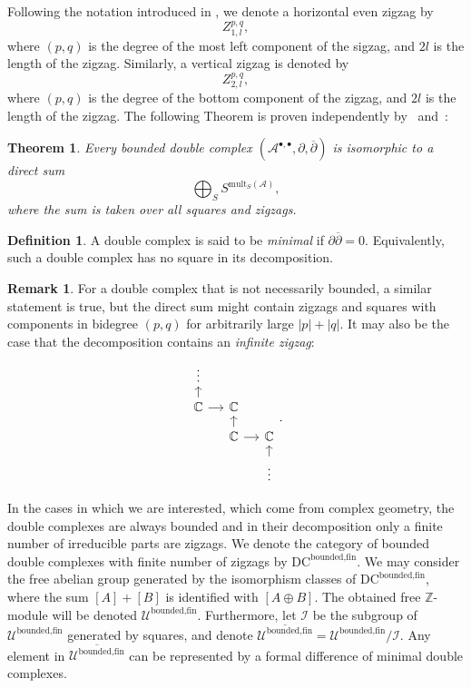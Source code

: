 \documentclass[leqno]{article}
\newtheorem{Theorem}[equation]{Theorem}
\theoremstyle{definition}
\newtheorem{Definition}[equation]{Definition}
\newtheorem{Remark}[equation]{Remark}
\numberwithin{equation}{section}
\begin{document}
Following the notation introduced in \cite{Ste}, we denote a horizontal even zigzag by
\[
Z^{p, q}_{1, l},
\]
where $(p, q)$ is the degree of the most left component of the sigzag, and $2l$ is the length of the zigzag. Similarly, a vertical zigzag is denoted by
\[
Z^{p, q}_{2, l},
\]
where $(p, q)$ is the degree of the bottom component of the zigzag, and $2l$ is the length of the zigzag.
The following Theorem is proven independently by~\cite{Ste} and~\cite{KQ}:
\begin{Theorem}
Every bounded double complex $(\mathcal{A}^{\bullet, \bullet}, \partial, \overline{\partial})$ is isomorphic to a direct sum
\[
\bigoplus_S S^{\text{mult}_S(\mathcal{A})},
\]
where the sum is taken over all squares and zigzags.
\end{Theorem}

\begin{Definition}
A double complex is said to be {\sl minimal} if $\partial \overline{\partial} = 0$. Equivalently, such a double complex has no square in its decomposition.
\end{Definition}

\begin{Remark}
For a double complex that is not necessarily bounded, a similar statement is true, but the direct sum might contain zigzags and squares with components in bidegree $(p, q)$ for arbitrarily large $|p| + |q|$. It may also be the case that the decomposition contains an {\sl infinite zigzag}:
\[
\begin{tikzcd}[row sep=small, column sep = small]
\vdots & & \\
\mathbb{C}\arrow[r] \arrow[u]& \mathbb{C} & \\
& \mathbb{C} \arrow[u] \arrow[r] & \mathbb{C} \\
& & \vdots \arrow[u]
\end{tikzcd}.
\]
\end{Remark}

In the cases in which we are interested, which come from complex geometry, the double complexes are always bounded and in their decomposition only a finite number of irreducible parts are zigzags. We denote the category of bounded double complexes with finite number of zigzags by $\text{DC}^{\text{bounded}, \text{fin}}$. We may consider the free abelian group generated by the isomorphism classes of $\text{DC}^{\text{bounded}, \text{fin}}$, where the sum $[A] + [B]$ is identified with $[A \oplus B]$. The obtained free $\mathbb{Z}$-module will be denoted $\mathcal{U}^{\text{bounded}, \text{fin}}$. Furthermore, let $\mathcal{I}$ be the subgroup of $\mathcal{U}^{\text{bounded}, \text{fin}}$ generated by squares, and denote $\overline{\mathcal{U}^{\text{bounded}, \text{fin}}} = \mathcal{U}^{\text{bounded}, \text{fin}} / \mathcal{I}$. Any element in $\overline{\mathcal{U}^{\text{bounded}, \text{fin}}}$  can be represented by a formal difference of minimal double complexes.
\end{document}
